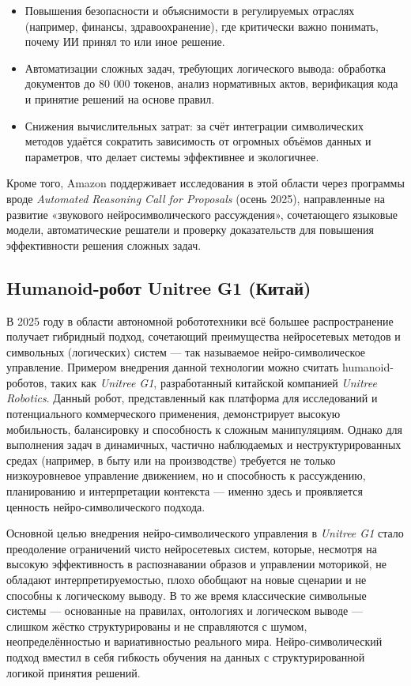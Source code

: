 \begin{itemize}
    \item Повышения безопасности и объяснимости в регулируемых отраслях (например, финансы, здравоохранение), где критически важно понимать, почему ИИ принял то или иное решение.
    \item Автоматизации сложных задач, требующих логического вывода: обработка документов до 80 000 токенов, анализ нормативных актов, верификация кода и принятие решений на основе правил.
    \item Снижения вычислительных затрат: за счёт интеграции символических методов удаётся сократить зависимость от огромных объёмов данных и параметров, что делает системы эффективнее и экологичнее.
\end{itemize}

Кроме того, Amazon поддерживает исследования в этой области через программы вроде \textit{Automated Reasoning Call for Proposals} (осень 2025), направленные на развитие «звукового нейросимволического рассуждения», сочетающего языковые модели, автоматические решатели и проверку доказательств для повышения эффективности решения сложных задач.

\subsection{Humanoid-робот Unitree G1 (Китай)}

В 2025 году в области автономной робототехники всё большее распространение получает гибридный подход, сочетающий преимущества нейросетевых методов и символьных (логических) систем — так называемое нейро-символическое управление. Примером внедрения данной технологии можно считать humanoid-роботов, таких как \textit{Unitree G1}, разработанный китайской компанией \textit{Unitree Robotics}. Данный робот, представленный как платформа для исследований и потенциального коммерческого применения, демонстрирует высокую мобильность, балансировку и способность к сложным манипуляциям. Однако для выполнения задач в динамичных, частично наблюдаемых и неструктурированных средах (например, в быту или на производстве) требуется не только низкоуровневое управление движением, но и способность к рассуждению, планированию и интерпретации контекста — именно здесь и проявляется ценность нейро-символического подхода.

Основной целью внедрения нейро-символического управления в \textit{Unitree G1} стало преодоление ограничений чисто нейросетевых систем, которые, несмотря на высокую эффективность в распознавании образов и управлении моторикой, не обладают интерпретируемостью, плохо обобщают на новые сценарии и не способны к логическому выводу. В то же время классические символьные системы — основанные на правилах, онтологиях и логическом выводе — слишком жёстко структурированы и не справляются с шумом, неопределённостью и вариативностью реального мира. Нейро-символический подход вместил в себя гибкость обучения на данных с структурированной логикой принятия решений.

